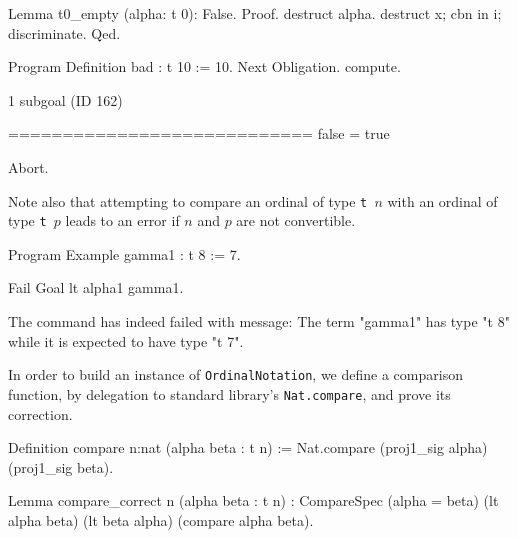 \begin{Coqsrc}
Lemma t0_empty (alpha: t 0): False.
Proof.
  destruct alpha.
  destruct x; cbn in i; discriminate.
Qed.


Program Definition bad : t 10 := 10.
Next Obligation.
  compute.
\end{Coqsrc}

\begin{Coqanswer}
1 subgoal (ID 162)
  
  ============================
  false = true
\end{Coqanswer}

\begin{Coqsrc}
Abort.
\end{Coqsrc}

Note also that attempting to compare an ordinal of type \texttt{t $n$}  with an ordinal of
type \texttt{t $p$}  leads to an error if $n$ and $p$ are not convertible.

\begin{Coqsrc}

Program Example gamma1 : t 8 := 7.

Fail Goal lt alpha1 gamma1.
\end{Coqsrc}

\begin{Coqanswer}
 The command has indeed failed with message:
The term "gamma1" has type "t 8" while it is expected to have type "t 7".
\end{Coqanswer}


In order to build an instance of \texttt{OrdinalNotation}, we define a comparison function, by delegation to standard library's  \texttt{Nat.compare}, and prove its correction.

\begin{Coqsrc}
Definition compare {n:nat} (alpha beta : t n) :=
  Nat.compare (proj1_sig alpha) (proj1_sig beta).

Lemma compare_correct {n} (alpha beta : t n) :
  CompareSpec (alpha = beta) (lt alpha beta) (lt beta alpha)
              (compare alpha beta).
\end{Coqsrc}

